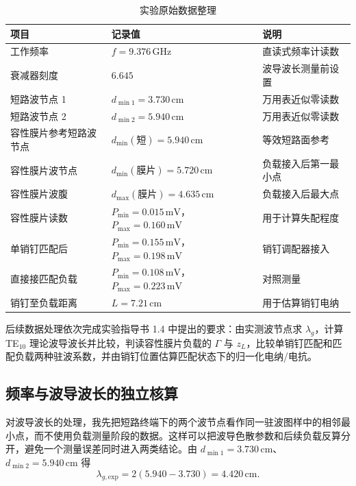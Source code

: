 \documentclass[UTF8]{ctexart}
\begin{document}
\begin{table}[H]
  \centering
  \caption{实验原始数据整理}
  \label{tab:raw-data}
  \begin{tabular}{lll}
    \toprule
    项目 & 记录值 & 说明 \\
    \midrule
    工作频率 & $f=9.376\,\mathrm{GHz}$ & 直读式频率计读数 \\
    衰减器刻度 & $6.645$ & 波导波长测量前设置 \\
    短路波节点 1 & $d_{\min1}=3.730\,\mathrm{cm}$ & 万用表近似零读数 \\
    短路波节点 2 & $d_{\min2}=5.940\,\mathrm{cm}$ & 万用表近似零读数 \\
    容性膜片参考短路波节点 & $d_{\min}(\text{短})=5.940\,\mathrm{cm}$ & 等效短路面参考 \\
    容性膜片波节点 & $d_{\min}(\text{膜片})=5.720\,\mathrm{cm}$ & 负载接入后第一最小点 \\
    容性膜片波腹 & $d_{\max}(\text{膜片})=4.635\,\mathrm{cm}$ & 负载接入后最大点 \\
    容性膜片读数 & $P_{\min}=0.015\,\mathrm{mV}$，$P_{\max}=0.160\,\mathrm{mV}$ & 用于计算失配程度 \\
    单销钉匹配后 & $P_{\min}=0.155\,\mathrm{mV}$，$P_{\max}=0.198\,\mathrm{mV}$ & 销钉调配器接入 \\
    直接接匹配负载 & $P_{\min}=0.108\,\mathrm{mV}$，$P_{\max}=0.223\,\mathrm{mV}$ & 对照测量 \\
    销钉至负载距离 & $L=7.21\,\mathrm{cm}$ & 用于估算销钉电纳 \\
    \bottomrule
  \end{tabular}
\end{table}

后续数据处理依次完成实验指导书 1.4 中提出的要求：由实测波节点求 $\lambda_g$，计算 TE$_{10}$ 理论波导波长并比较，判读容性膜片负载的 $\Gamma$ 与 $z_L$，比较单销钉匹配和匹配负载两种驻波系数，并由销钉位置估算匹配状态下的归一化电纳/电抗。

\subsection{频率与波导波长的独立核算}

对波导波长的处理，我先把短路终端下的两个波节点看作同一驻波图样中的相邻最小点，而不使用负载测量阶段的数据。这样可以把波导色散参数和后续负载反算分开，避免一个测量误差同时进入两类结论。由 $d_{\min1}=3.730\,\mathrm{cm}$、$d_{\min2}=5.940\,\mathrm{cm}$ 得
\begin{equation}
  \lambda_{g,\mathrm{exp}}=2(5.940-3.730)=4.420\,\mathrm{cm}.
  \label{eq:lg-exp-num}
\end{equation}
\end{document}
